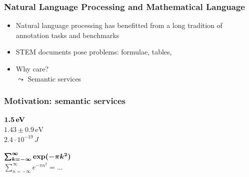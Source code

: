 
\begin{frame}
    \frametitle{Natural Language Processing and Mathematical Language}
    \begin{itemize}
        \item Natural language processing has benefitted from a long tradition of annotation tasks and benchmarks
        \item STEM documents pose problems:
            formulae, tables, \textellipsis
        \item Why care?\\
            $\leadsto$ Semantic services
    \end{itemize}
\end{frame}


\begin{frame}
    \frametitle{Motivation: semantic services}
    \faSearch\;\; $\bm{1.5\,\text{\bf eV}}$
    \\[1em]
        \quad\quad\faExternalLink\;\; $1.43 \pm 0.9\,\text{eV}$\\[1em]
        \quad\quad\faExternalLink\;\; $2.4 \cdot 10^{-19}\,J$

    \vspace{3em}
    \faSearch\;\; $\bm{\sum_{k=-\infty}^\infty \text{\bf exp}(-\pi k^2)}$
    \\[1em]
        \quad\quad\faExternalLink\;\; $\sum_{n=-\infty}^\infty e^{-\pi n^2} = \ldots$
\end{frame}


